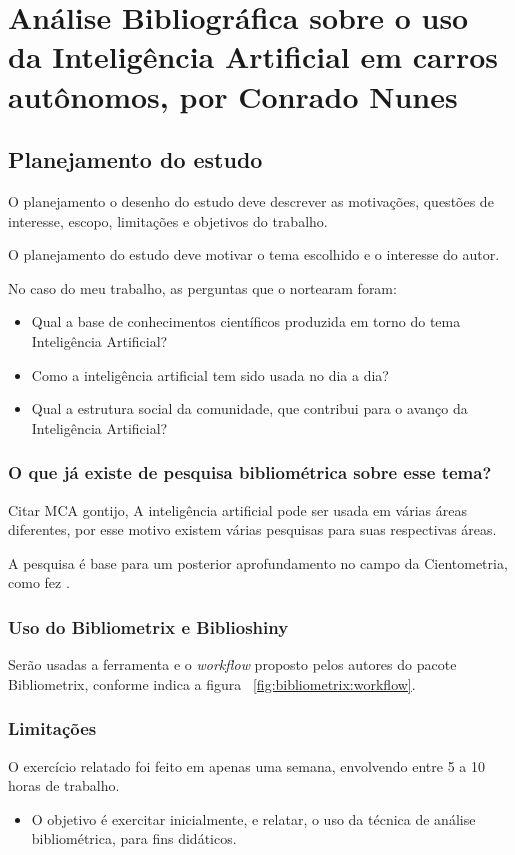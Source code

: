 \chapter{Análise Bibliográfica sobre o uso da Inteligência Artificial em carros autônomos, por Conrado Nunes\label{chap:bibliometria:Conras21}}

\section{Planejamento do estudo}
O planejamento o  desenho do estudo deve descrever as motivações, questões de interesse, escopo, limitações e objetivos do trabalho.

O planejamento do estudo deve motivar o tema escolhido e o interesse do autor.

No caso do meu trabalho, as perguntas que o nortearam foram:
\begin{itemize}
    \item Qual a base de conhecimentos científicos produzida em torno do tema Inteligência Artificial? 
    \item Como a inteligência artificial tem sido usada no dia a dia? 
    \item Qual a estrutura social da comunidade, que contribui para o avanço da Inteligência Artificial?
\end{itemize}

\subsection{O que já existe de pesquisa bibliométrica sobre esse tema?}

Citar MCA gontijo, A inteligência artificial pode ser usada em várias áreas diferentes, por esse motivo existem várias pesquisas para suas respectivas áreas.

A pesquisa é base para um posterior aprofundamento no campo da Cientometria, como fez \cite{chavalarias_whats_2017}.

\subsection{Uso do Bibliometrix e Biblioshiny}
Serão usadas a ferramenta e o \textit{workflow} proposto pelos autores do pacote Bibliometrix, conforme indica a figura ~\ref{fig:bibliometrix:workflow}.

\subsection{Limitações} O exercício relatado foi feito em apenas uma semana, envolvendo entre 5 a 10 horas de trabalho.


\begin{itemize}
\item O objetivo é exercitar inicialmente, e relatar, o uso da técnica de análise bibliométrica, para fins didáticos.
\end{itemize}